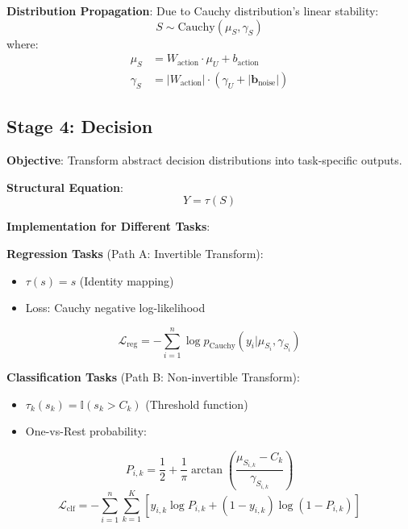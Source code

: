\documentclass[conference]{IEEEtran}
\newcommand{\cauchy}{\text{Cauchy}}
\newcommand{\indicator}{\mathbb{I}}
\begin{document}
\textbf{Distribution Propagation}: Due to Cauchy distribution's linear stability:
\begin{equation}
S \sim \cauchy(\mu_S, \gamma_S)
\end{equation}
where:
\begin{align}
\mu_S &= W_{\text{action}} \cdot \mu_U + b_{\text{action}} \\
\gamma_S &= |W_{\text{action}}| \cdot (\gamma_U + |\mathbf{b}_{\text{noise}}|)
\end{align}

\subsection{Stage 4: Decision}

\textbf{Objective}: Transform abstract decision distributions into task-specific outputs.

\textbf{Structural Equation}:
\begin{equation}
Y = \tau(S)
\end{equation}

\textbf{Implementation for Different Tasks}:

\textbf{Regression Tasks} (Path A: Invertible Transform):
\begin{itemize}
\item $\tau(s) = s$ (Identity mapping)
\item Loss: Cauchy negative log-likelihood
\end{itemize}
\begin{equation}
\mathcal{L}_{\text{reg}} = -\sum_{i=1}^n \log p_{\cauchy}(y_i | \mu_{S_i}, \gamma_{S_i})
\end{equation}

\textbf{Classification Tasks} (Path B: Non-invertible Transform):
\begin{itemize}
\item $\tau_k(s_k) = \indicator(s_k > C_k)$ (Threshold function)  
\item One-vs-Rest probability:
\end{itemize}
\begin{equation}
P_{i,k} = \frac{1}{2} + \frac{1}{\pi} \arctan\left(\frac{\mu_{S_{i,k}} - C_k}{\gamma_{S_{i,k}}}\right)
\end{equation}
\begin{equation}
\mathcal{L}_{\text{clf}} = -\sum_{i=1}^n \sum_{k=1}^K [y_{i,k} \log P_{i,k} + (1-y_{i,k}) \log(1-P_{i,k})]
\end{equation}
\end{document}
